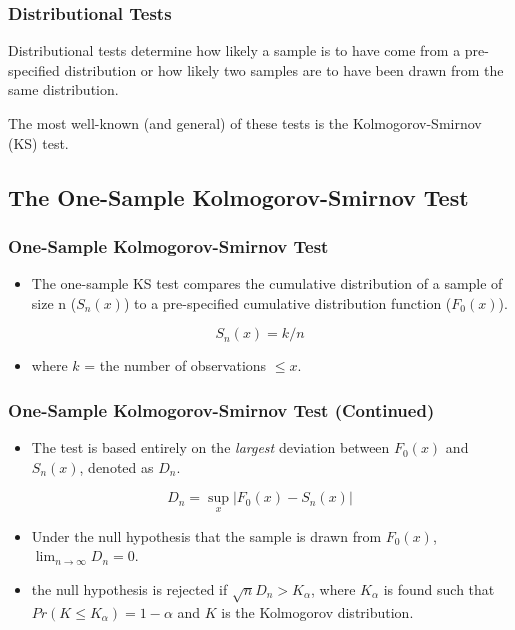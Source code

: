 \begin{frame}
\frametitle{Distributional Tests}

Distributional tests determine how likely a sample is to have come from a pre-specified distribution or how likely two samples are to have been drawn from the same distribution.

\vspace{.25in}

The most well-known (and general) of these tests is the Kolmogorov-Smirnov (KS) test.
\end{frame}


\subsection{The One-Sample Kolmogorov-Smirnov Test}

\begin{frame}
\frametitle{One-Sample Kolmogorov-Smirnov Test}
\begin{itemize}
    \item The one-sample KS test compares the cumulative distribution of a sample of size n ($S_n(x)$) to a pre-specified cumulative distribution function ($F_0(x)$).
\end{itemize}
$$S_n(x) = k/n$$
\begin{itemize}
    \item where $k$ = the number of observations $\leq x$.
\end{itemize}
\end{frame}


\begin{frame}
\frametitle{One-Sample Kolmogorov-Smirnov Test (Continued)}
\begin{itemize}
    \item The test is based entirely on the \textit{largest} deviation between $F_0(x)$ and $S_n(x)$, denoted as $D_n$.
\end{itemize}
\vspace{.25in}
$$ D_n = \sup_{x} |F_0(x) - S_n(x)| $$
\begin{itemize}
    \item Under the null hypothesis that the sample is drawn from $F_0(x)$, $\lim_{n \to \infty}D_n = 0.$
    \item the null hypothesis is rejected if $\sqrt{n}D_n > K_{\alpha}$, where $K_{\alpha}$ is found such that $Pr(K \leq K_{\alpha}) = 1 - \alpha$ and $K$ is the Kolmogorov distribution.
\end{itemize}
\end{frame}

